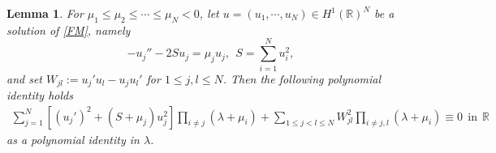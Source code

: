 \documentclass[11pt]{article}
\numberwithin{equation}{section}
\newtheorem{lemma}[theorem]{Lemma}
\newcommand{\R}{{\mathbb{R}}}
\theoremstyle{definition}
\begin{document}
\begin{lemma}\label{lem:polynomial-identity-function}
For $\mu_1\leq \mu_2\leq\cdots\leq \mu_N<0$, let \(u=(u_1,\cdots,u_N)\in H^1(\mathbb R)^N\) be a solution of
\eqref{FM}, namely
\[
-u_j''-2Su_j=\mu_j u_j,\ \
S=\sum_{i=1}^N u_i^2 ,
\]
and set
$
W_{jl}:=u_j'u_l-u_j u_l'$ for $1\leq j,l\leq N$. Then the following polynomial identity holds
	\begin{equation}\label{eq:polynomial-identity-function}
		\begin{split}
			\sum_{j=1}^N
			\left[
			(u_j')^2+(S+\mu_j)u_j^2
			\right]
			\prod_{i\neq j}(\lambda+\mu_i)
			+
			\sum_{1\leq j<l\leq N}
			W_{jl}^2
			\prod_{i\neq j,l}(\lambda+\mu_i)
			\equiv 0 \ \ \text{in} \ \ \R
		\end{split}
	\end{equation}
	as a polynomial identity in \(\lambda\).
\end{lemma}
\end{document}
